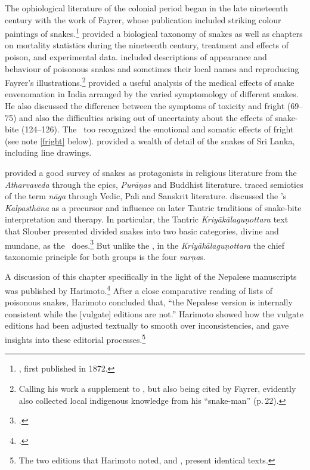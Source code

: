 The ophiological literature of the colonial period began in the late
nineteenth century with the work of Fayrer, whose publication included
striking colour paintings of snakes.\footnote{\cite{fayr-1874}, first
    published in 1872.} \citeauthor{fayr-1874} provided a biological taxonomy
    of snakes as well as chapters on mortality statistics during the
    nineteenth century, treatment and effects of poison, and experimental
    data. \citet{ewar-1878} included descriptions of appearance and behaviour
    of poisonous snakes and sometimes their local names and reproducing
    Fayrer's illustrations.\footnote{Calling his work a supplement to
        \citet{fayr-1874}, but also being cited by Fayrer, \cite{ewar-1878}
        evidently also collected local indigenous knowledge from his “snake-man”
        (p.\,22).} \citet[75--124]{wall-1913} provided a useful analysis of the
        medical effects of snake envenomation in India arranged by the varied
        symptomology of different snakes.  He also discussed the difference
        between the symptoms of toxicity and fright (69--75) and also the
        difficulties arising out of uncertainty about the effects of snake-bite
        (124--126).  The \SS\ too recognized the emotional and somatic effects of
        fright (see note \ref{fright} below). \citet{wall-1921} provided a wealth
        of detail of the snakes of Sri Lanka, including line drawings.
        
\citet{doni-2015} provided a good survey of snakes as protagonists in
religious literature from the \emph{Atharvaveda} through the epics,
\emph{Purāṇas} and Buddhist literature. \citet{seme-1979} traced
semiotics of the term \emph{nāga} through Vedic, Pali and Sanskrit
literature.  \citet[31--33 \emph{et passim}]{slou-2016} discussed the
\SS's \emph{Kalpasthāna} as a precursor and influence on later Tantric
traditions of snake-bite interpretation and therapy.  In particular, the
Tantric \emph{Kriyākālaguṇottara} text that Slouber presented
divided snakes into two basic categories, divine and mundane, as the \SS\
does.\footcite[144--145]{slou-2016}  But unlike the \SS, in the
\emph{Kriyākālaguṇottara} the chief taxonomic principle for both groups
is the four \emph{varṇa}s.  
    
A discussion of this chapter specifically in the light of the Nepalese
manuscripts was published by Harimoto.\footcite[101--104]{hari-2011} After a
close comparative reading of lists of poisonous snakes, Harimoto concluded
that, “the Nepalese version is internally consistent while the [vulgate]
editions are not.”  Harimoto showed how the vulgate editions had been
adjusted textually to smooth over inconsistencies, and gave insights into
these editorial processes.\footnote{The two editions that Harimoto noted,
    \cite{vulgate} and \cite{bhat-1889}, present identical texts.}


